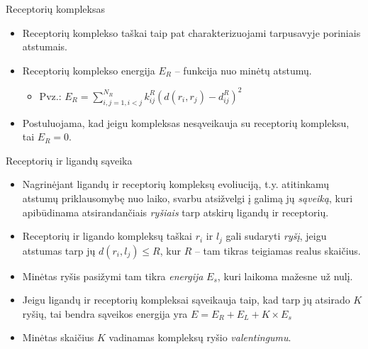 \documentclass[11pt]{beamer}
\begin{document}
\begin{frame}{Receptorių kompleksas}
\begin{itemize}
\item Receptorių komplekso taškai taip pat charakterizuojami tarpusavyje poriniais atstumais.
\item Receptorių komplekso energija $E_R$  -- funkcija nuo minėtų atstumų.
    \begin{itemize}
       \item Pvz.: $E_R = \sum\limits_{i,j=1,i<j}^{N_R} k_{ij}^R (d(r_i,r_j) - d_{ij}^R)^{2} $
    \end{itemize}
\item Postuluojama, kad jeigu kompleksas nesąveikauja su receptorių kompleksu, tai $E_R = 0$.
\end{itemize}
\end{frame}



\begin{frame}{Receptorių ir ligandų sąveika }
\begin{itemize}
\item Nagrinėjant ligandų ir receptorių kompleksų evoliuciją, t.y. atitinkamų atstumų priklausomybę nuo laiko, 
svarbu atsižvelgi į galimą jų \textit{sąveiką}, kuri apibūdinama atsirandančiais \textit{ryšiais} tarp atskirų ligandų ir receptorių.
\item Receptorių ir ligando kompleksų taškai $r_i$ ir $l_j$ gali sudaryti \textit{ryšį}, jeigu  atstumas tarp jų 
$d(r_i,l_j) \leqslant R$, kur $R$ -- tam tikras teigiamas realus skaičius. 
\item Minėtas ryšis pasižymi tam tikra \textit{energija} $E_s$, kuri laikoma mažesne už nulį.
\item Jeigu ligandų ir receptorių kompleksai  sąveikauja taip, kad tarp jų atsirado $K$ ryšių, tai bendra sąveikos energija
yra $E = E_R + E_L + K \times E_s$
\item Minėtas skaičius $K$ vadinamas kompleksų ryšio \textit{valentingumu}.
\end{itemize}
\end{frame}

\end{document}
